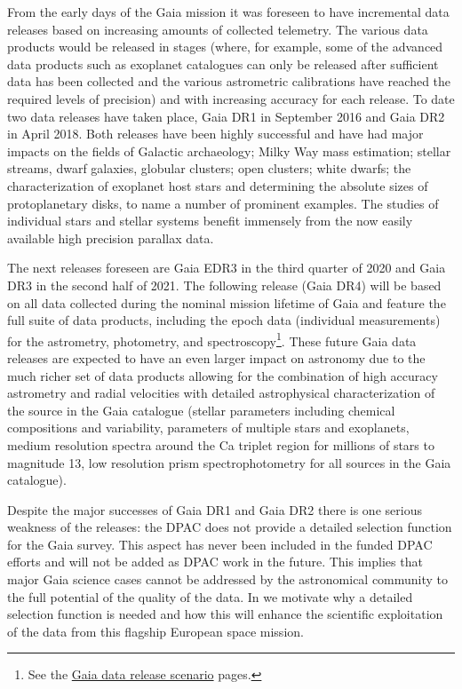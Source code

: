 From the early days of the Gaia mission it was foreseen to have incremental data releases based on increasing amounts of collected telemetry. The various data products would be released in stages (where, for example, some of the advanced data products such as exoplanet catalogues can only be released after sufficient data has been collected and the various astrometric calibrations have reached the required levels of precision) and with increasing accuracy for each release. To date two data releases have taken place, Gaia DR1 in September 2016 and Gaia DR2 in April 2018. Both releases have been highly successful and have had major impacts on the fields of Galactic archaeology; Milky Way mass estimation; stellar streams, dwarf galaxies, globular clusters; open clusters; white dwarfs; the characterization of exoplanet host stars and determining the absolute sizes of protoplanetary disks, to name a number of prominent examples. The studies of individual stars and stellar systems benefit immensely from the now easily available high precision parallax data.

The next releases foreseen are Gaia EDR3 in the third quarter of 2020 and Gaia DR3 in the second half of 2021. The following release (Gaia DR4) will be based on all data collected during the nominal mission lifetime of Gaia and feature the full suite of data products, including the epoch data (individual measurements) for the astrometry, photometry, and spectroscopy\footnote{See the \href{https://www.cosmos.esa.int/web/gaia/release}{Gaia data release scenario} pages.}. These future Gaia data releases are expected to have an even larger impact on astronomy due to the much richer set of data products allowing for the combination of high accuracy astrometry and radial velocities with detailed astrophysical characterization of the source in the Gaia catalogue (stellar parameters including chemical compositions and variability, parameters of multiple stars and exoplanets, medium resolution spectra around the Ca triplet region for millions of stars to magnitude 13, low resolution prism spectrophotometry for all sources in the Gaia catalogue). 

Despite the major successes of Gaia DR1 and Gaia DR2 there is one serious weakness of the releases: the DPAC does not provide a detailed selection function for the Gaia survey. This aspect has never been included in the funded DPAC efforts and will not be added as DPAC work in the future. This implies that major Gaia science cases cannot be addressed by the astronomical community to the full potential of the quality of the data. In  we motivate why a detailed selection function is needed and how this will enhance the scientific exploitation of the data from this flagship European space mission. 

